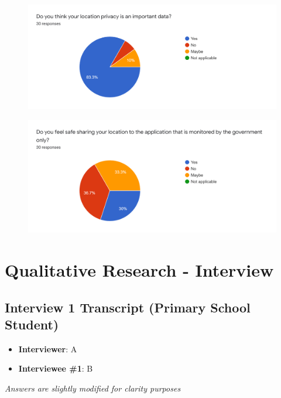 \begin{appendices}
\begin{figure}[H]
    \end{figure}
    \begin{figure}[H]
      \centering
      \includegraphics[width=18cm]{img/Survey/Q8.png}
    \end{figure}
    \begin{figure}[H]
      \centering
      \includegraphics[width=18cm]{img/Survey/Q9.png}
    \end{figure}

  \section{Qualitative Research - Interview} \label{appendix:qualitative}

    \subsection{Interview 1 Transcript (Primary School Student)}
      \begin{itemize}
        \item \textbf{Interviewer}: A
        \item \textbf{Interviewee \#1}: B
      \end{itemize}
      \par \textit{Answers are slightly modified for clarity purposes}


\end{appendices}

